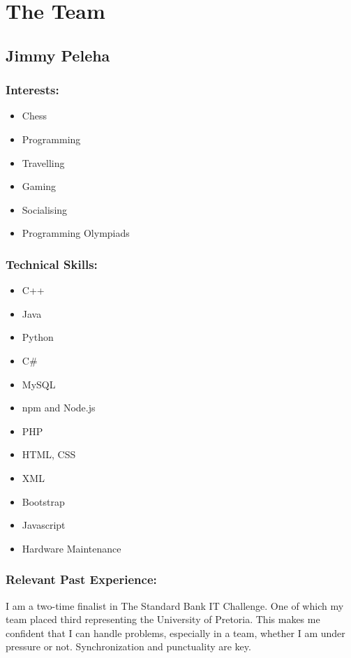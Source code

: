 \section{The Team}

\subsection{Jimmy Peleha}

\subsubsection{Interests:}
\begin{itemize}
	\item Chess
	\item Programming
	\item Travelling
	\item Gaming
	\item Socialising
	\item Programming Olympiads
\end{itemize}

\subsubsection{Technical Skills:}
\begin{itemize}
	\item C++
	\item Java
	\item Python
	\item C#
	\item MySQL
	\item npm and Node.js
	\item PHP
	\item HTML, CSS
	\item XML
	\item Bootstrap
	\item Javascript
	\item Hardware Maintenance 
\end{itemize}


\subsubsection{Relevant Past Experience:}
\par{I am a two-time finalist in The Standard Bank IT Challenge. One of which my team placed third representing the University of Pretoria. This makes me confident that I can handle problems, especially in a team, whether I am under pressure or not. Synchronization and punctuality are key.}

